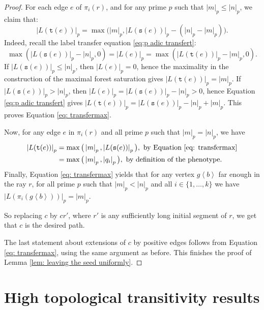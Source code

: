 \documentclass[12pt]{article}
\numberwithin{equation}{section}
\theoremstyle{definition}
\newcommand{\la}{\left\langle}
\newcommand{\ra}{\right\rangle}
\newcommand{\abs}[1]{\left\lvert #1\right\rvert}
\newcommand{\source}{\mathtt{s}}
\newcommand{\target}{\mathtt{t}}
\newcommand\pathinT{c}
\begin{document}
\begin{proof}
        For each edge $e$ of $\pi_i(r)$, and for any prime $p$ such that $\abs{m}_p\leq\abs{n}_p$, we claim that:
        \begin{equation}\label{eq: transfermax}
        \abs{L(\target(e))}_p=\max\big(\abs m_p,\abs{L(\source(e))}_p-(\abs n_p-\abs m_p)\big).
        \end{equation}
        Indeed, recall the label transfer equation \eqref{eq:p adic transfert}: 
               \[
            \max(\abs{L(\source(e))}_p - \abs{n}_p,0)
            = \abs{L(e)}_p
            = \max(\abs{L(\target(e))}_p - \abs{m}_p, 0).
        \]
        If $\abs{L(\source(e))}_p \leq \abs{n}_p$, then  $\abs{L(e)}_p = 0$, hence the maximality in the construction of the maximal forest saturation gives
        $\abs{L(\target(e))}_p = \abs{m}_p$.
        If $\abs{L(\source(e))}_p > \abs{n}_p$, then $\abs{L(e)}_p = \abs{L(\source(e))}_p-\abs n_p > 0$, hence 
        Equation \eqref{eq:p adic transfert} gives 
        $\abs{L(\target(e))}_p = \abs{L(\source(e))}_p-\abs n_p+\abs m_p$.
        This proves Equation \eqref{eq: transfermax}.

        Now, for any edge $e$ in $\pi_i(r)$ and all prime $p$
        such     that $\abs{m}_p=\abs{n}_p$,
        we have
 \begin{align*}  \abs{L(\target(e))}_p 
            & = \max\big(\abs m_p,\abs{L(\source(e))}_p\big),
            \text{ by Equation \eqref{eq: transfermax}}\\
            & = \max\big(\abs m_p,\abs{q_i}_p\big), 
            \text{ by definition of the phenotype}. 
        \end{align*}
        Finally, Equation \eqref{eq: transfermax}  yields that for any vertex $g\la b\ra$ far enough in the ray $r$, for all prime $p$
        such that $\abs{m}_p<\abs{n}_p$ and  all $i \in \{1, \ldots, k\}$
        we have
        $\abs{L(\pi_i(g\la b\ra))}_p=\abs m_p$.        
    
        So replacing $\pathinT$ by $\pathinT r'$, where $r'$ is any sufficiently long
        initial segment of $r$, we get that $\pathinT$ is the desired path.
        
        The last statement about extensions of $\pathinT$ by positive edges
        follows from Equation \eqref{eq: transfermax}, using the same argument as before.
        This finishes the proof of Lemma \ref{lem: leaving the seed uniformly}.
\end{proof}

\section{High topological transitivity results}
\end{document}

